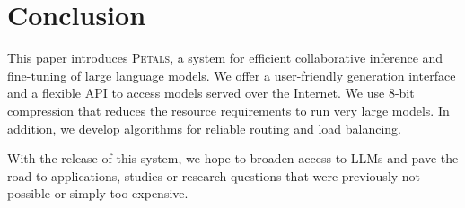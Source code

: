 \section{Conclusion}

This paper introduces \textsc{Petals}, a system for efficient collaborative inference and fine-tuning of large language models. We offer a user-friendly generation interface and a flexible API to access models served over the Internet. We use 8-bit compression that reduces the resource requirements to run very large models. In addition, we develop algorithms for reliable routing and load balancing.

With the release of this system, we hope to broaden access to LLMs and pave the road to applications, studies or research questions that were previously not possible or simply too expensive.

